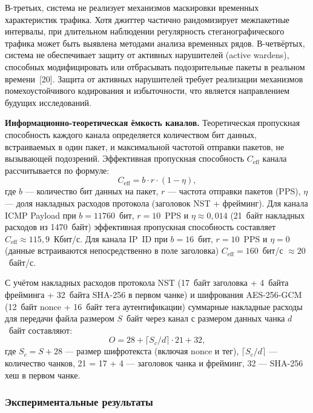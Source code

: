 В-третьих, система не реализует механизмов маскировки временных характеристик трафика. Хотя джиттер частично рандомизирует межпакетные интервалы, при длительном наблюдении регулярность стеганографического трафика может быть выявлена методами анализа временных рядов. В-четвёртых, система не обеспечивает защиту от активных нарушителей (active wardens), способных модифицировать или отбрасывать подозрительные пакеты в реальном времени~[20]. Защита от активных нарушителей требует реализации механизмов помехоустойчивого кодирования и избыточности, что является направлением будущих исследований.

\textbf{Информационно-теоретическая ёмкость каналов.} Теоретическая пропускная способность каждого канала определяется количеством бит данных, встраиваемых в один пакет, и максимальной частотой отправки пакетов, не вызывающей подозрений. Эффективная пропускная способность $C_{\text{eff}}$ канала рассчитывается по формуле:
\begin{equation}
C_{\text{eff}} = b \cdot r \cdot (1 - \eta),
\label{eq:channel_capacity}
\end{equation}
где $b$ --- количество бит данных на пакет, $r$ --- частота отправки пакетов (PPS), $\eta$ --- доля накладных расходов протокола (заголовок NST + фрейминг). Для канала ICMP Payload при $b = 11760$~бит, $r = 10$~PPS и $\eta \approx 0{,}014$ (21~байт накладных расходов из 1470~байт) эффективная пропускная способность составляет $C_{\text{eff}} \approx 115{,}9$~Кбит/с. Для канала IP~ID при $b = 16$~бит, $r = 10$~PPS и $\eta = 0$ (данные встраиваются непосредственно в поле заголовка) $C_{\text{eff}} = 160$~бит/с $\approx 20$~байт/с.

С учётом накладных расходов протокола NST (17~байт заголовка + 4~байта фрейминга + 32~байта SHA-256 в первом чанке) и шифрования AES-256-GCM (12~байт nonce + 16~байт тега аутентификации) суммарные накладные расходы для передачи файла размером $S$~байт через канал с размером данных чанка $d$~байт составляют:
\begin{equation}
O = 28 + \lceil S_c / d \rceil \cdot 21 + 32,
\label{eq:overhead}
\end{equation}
где $S_c = S + 28$ --- размер шифротекста (включая nonce и тег), $\lceil S_c / d \rceil$ --- количество чанков, 21 = 17 + 4 --- заголовок чанка и фрейминг, 32 --- SHA-256 хеш в первом чанке.

\subsubsection{Экспериментальные результаты}

